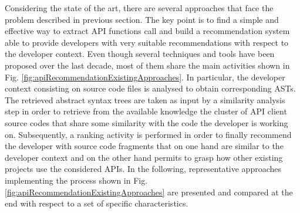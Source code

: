 Considering the state of the art, there are several approaches that face the 
problem described in previous section. The key point is to find a simple and 
effective way to extract API functions call and build a recommendation system 
able to provide developers with very suitable recommendations with respect to 
the developer context. Even though several techniques and tools have been 
proposed over the last decade, most of them share the main activities shown in 
Fig. \ref{fig:apiRecommendationExistingApproaches}. In particular, the 
developer context consisting on source code files is analysed to obtain 
corresponding ASTs. The retrieved abstract syntax trees are taken as input by a 
similarity analysis step in order to retrieve from the available knowledge the 
cluster of API client source codes that share some similarity with the code the 
developer is working on. Subsequently, a ranking activity is performed in order 
to finally recommend the developer with source code fragments that on one hand 
are similar to the developer context and on the other hand permits to grasp how 
other existing projects use the considered APIs. In the following, 
representative approaches implementing the process shown in Fig. 
\ref{fig:apiRecommendationExistingApproaches} are presented and compared at the 
end with respect to a set of specific characteristics.





